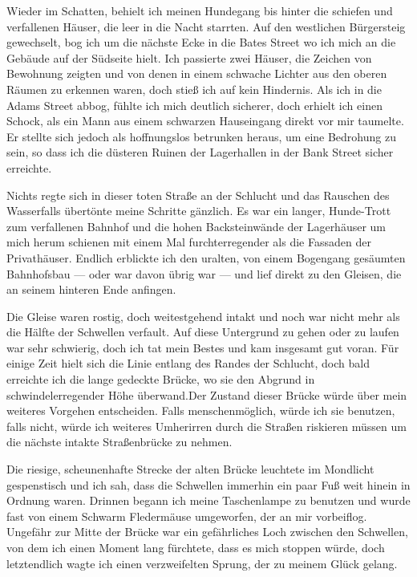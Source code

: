 Wieder im Schatten, behielt ich meinen Hundegang bis hinter die schiefen und verfallenen Häuser, die leer in die Nacht starrten. Auf den westlichen Bürgersteig gewechselt, bog ich um die nächste Ecke in die Bates Street wo ich mich an die Gebäude auf der Südseite hielt. Ich passierte zwei Häuser, die Zeichen von Bewohnung zeigten und von denen in einem schwache Lichter aus den oberen Räumen zu erkennen waren, doch stieß ich auf kein Hindernis. Als ich in die Adams Street abbog, fühlte ich mich deutlich sicherer, doch erhielt ich einen Schock, als ein Mann aus einem schwarzen Hauseingang direkt vor mir taumelte. Er stellte sich jedoch als hoffnungslos betrunken heraus, um eine Bedrohung zu sein, so dass ich die düsteren Ruinen der Lagerhallen in der Bank Street sicher erreichte.

Nichts regte sich in dieser toten Straße an der Schlucht und das Rauschen des Wasserfalls übertönte meine Schritte gänzlich. Es war ein langer, Hunde-Trott zum verfallenen Bahnhof und die hohen Backsteinwände der Lagerhäuser um mich herum schienen mit einem Mal furchterregender als die Fassaden der Privathäuser. Endlich erblickte ich den uralten, von einem Bogengang gesäumten Bahnhofsbau --- oder war davon übrig war --- und lief direkt zu den Gleisen, die an seinem hinteren Ende anfingen.

Die Gleise waren rostig, doch weitestgehend intakt und noch war nicht mehr als die Hälfte der Schwellen verfault. Auf diese Untergrund zu gehen oder zu laufen war sehr schwierig, doch ich tat mein Bestes und kam insgesamt gut voran. Für einige Zeit hielt sich die Linie entlang des Randes der Schlucht, doch bald erreichte ich die lange gedeckte Brücke, wo sie den Abgrund in schwindelerregender Höhe überwand.Der Zustand dieser Brücke würde über mein weiteres Vorgehen entscheiden. Falls menschenmöglich, würde ich sie benutzen, falls nicht, würde ich weiteres Umherirren durch die Straßen riskieren müssen um die nächste intakte Straßenbrücke zu nehmen.

Die riesige, scheunenhafte Strecke der alten Brücke leuchtete im Mondlicht gespenstisch und ich sah, dass die Schwellen immerhin ein paar Fuß weit hinein in Ordnung waren. Drinnen begann ich meine Taschenlampe zu benutzen und wurde fast von einem Schwarm Fledermäuse umgeworfen, der an mir vorbeiflog. Ungefähr zur Mitte der Brücke war ein gefährliches Loch zwischen den Schwellen, von dem ich einen Moment lang fürchtete, dass es mich stoppen würde, doch letztendlich wagte ich einen verzweifelten Sprung, der zu meinem Glück gelang.

